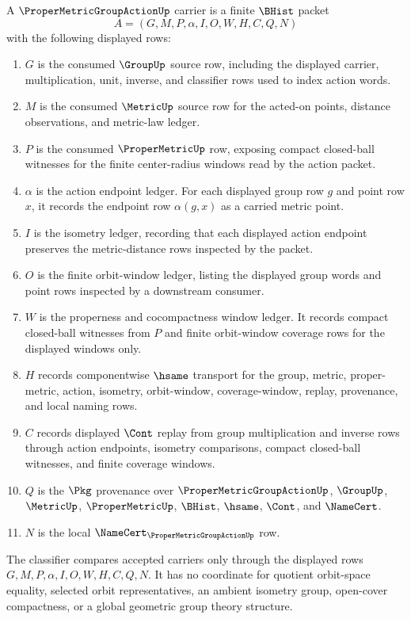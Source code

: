 \begin{definition}
\label{def:proper-metric-group-action-carrier}
A $\ProperMetricGroupActionUp$ carrier is a finite $\BHist$ packet
$$
A=(G,M,P,\alpha,I,O,W,H,C,Q,N)
$$
with the following displayed rows:
\begin{enumerate}
\item $G$ is the consumed $\GroupUp$ source row, including the displayed carrier, multiplication, unit, inverse, and classifier rows used to index action words.
\item $M$ is the consumed $\MetricUp$ source row for the acted-on points, distance observations, and metric-law ledger.
\item $P$ is the consumed $\ProperMetricUp$ row, exposing compact closed-ball witnesses for the finite center-radius windows read by the action packet.
\item $\alpha$ is the action endpoint ledger. For each displayed group row $g$ and point row $x$, it records the endpoint row $\alpha(g,x)$ as a carried metric point.
\item $I$ is the isometry ledger, recording that each displayed action endpoint preserves the metric-distance rows inspected by the packet.
\item $O$ is the finite orbit-window ledger, listing the displayed group words and point rows inspected by a downstream consumer.
\item $W$ is the properness and cocompactness window ledger. It records compact closed-ball witnesses from $P$ and finite orbit-window coverage rows for the displayed windows only.
\item $H$ records componentwise $\hsame$ transport for the group, metric, proper-metric, action, isometry, orbit-window, coverage-window, replay, provenance, and local naming rows.
\item $C$ records displayed $\Cont$ replay from group multiplication and inverse rows through action endpoints, isometry comparisons, compact closed-ball witnesses, and finite coverage windows.
\item $Q$ is the $\Pkg$ provenance over $\ProperMetricGroupActionUp$, $\GroupUp$, $\MetricUp$, $\ProperMetricUp$, $\BHist$, $\hsame$, $\Cont$, and $\NameCert$.
\item $N$ is the local $\NameCert_{\ProperMetricGroupActionUp}$ row.
\end{enumerate}
The classifier compares accepted carriers only through the displayed rows $G,M,P,\alpha,I,O,W,H,C,Q,N$. It has no coordinate for quotient orbit-space equality, selected orbit representatives, an ambient isometry group, open-cover compactness, or a global geometric group theory structure.
\end{definition}

